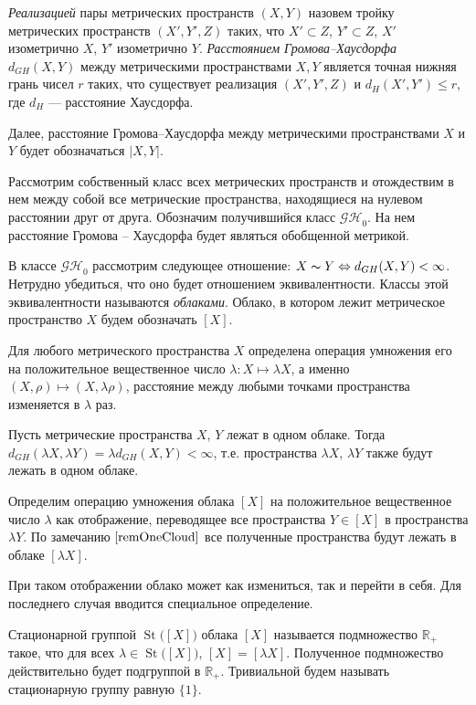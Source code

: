 \documentclass[11pt,twoside,draft
]{article}
\DeclareMathOperator{\St}{St}
\begin{document}
\begin{defin}
	\emph{Реализацией} пары метрических пространств $(X,Y)$ назовем тройку
	метрических пространств $(X',Y',Z)$ таких, что $X' \subset Z$, $Y' \subset Z$,
	$X'$ изометрично $X$, $Y'$ изометрично $Y$. \emph{Расстоянием Громова--Хаусдорфа}
	$d_{GH}(X,Y)$ между метрическими пространствами $X, Y$ является точная нижняя
	грань чисел $r$ таких, что существует реализация $(X',Y',Z)$ и $d_H(X', Y')
	\le
	r$, где $d_H$ --- расстояние Хаусдорфа.
\end{defin}
Далее, расстояние Громова--Хаусдорфа между метрическими пространствами $X$ и $Y$ будет обозначаться $|X,Y|$.

Рассмотрим собственный класс всех метрических пространств и отождествим в нем между собой все метрические пространства, находящиеся на нулевом расстоянии друг от друга. Обозначим получившийся класс $\mathcal{GH}_0$.  На нем расстояние Громова -- Хаусдорфа будет являться обобщенной метрикой.

\begin{defin} В классе $\mathcal{GH}_{0}$ рассмотрим следующее
	отношение: $X \thicksim Y \Leftrightarrow d_{GH}(X, Y) < \infty$. Нетрудно
	убедиться, что оно будет отношением эквивалентности. Классы этой эквивалентности
	называются \emph{облаками}. Облако, в котором лежит метрическое пространство $X$
	будем обозначать $[X]$.
\end{defin}

Для любого метрического пространства $X$ определена операция умножения его
на положительное вещественное число $\lambda\colon X\mapsto \lambda X$, а именно
$(X, \rho) \mapsto (X, \lambda \rho)$, расстояние между любыми точками
пространства изменяется в $\lambda$ раз.
\begin{remark} Пусть метрические
	пространства $X$, $Y$ лежат в одном облаке. Тогда
	$d_{GH}(\lambda X, \lambda Y) = \lambda d_{GH}(X,Y) < \infty$, т.е. пространства
	$\lambda X$, $\lambda Y$ также будут лежать в одном облаке.
	\label{remOneCloud}
\end{remark}
\begin{defin}Определим операцию умножения облака $[X]$ на положительное вещественное
	число $\lambda$ как отображение, переводящее все пространства $Y \in [X]$ в
	пространства $\lambda Y$. По замечанию $\ref{remOneCloud}$ все полученные пространства будут
	лежать в облаке $[\lambda X]$.
\end{defin} 
При таком отображении облако может как
измениться, так и перейти в себя. Для последнего случая вводится специальное
определение.
\begin{defin}
	Стационарной группой $\St\bigl([X]\bigr)$ облака $[X]$
	называется подмножество $\mathbb{R}_+$ такое, что для всех
	$\lambda \in \St\bigl([X]\bigr)$, $[X] = [\lambda X]$. Полученное подмножество
	действительно будет подгруппой в $\mathbb{R}_+$. Тривиальной
	будем называть стационарную группу равную $\{1\}$.
\end{defin}
\end{document}
